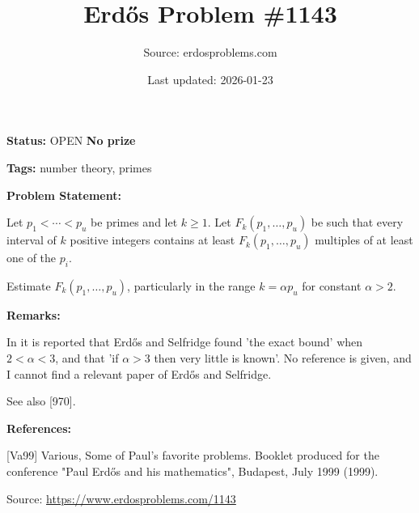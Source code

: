 \documentclass{article}
\title{Erd\H{o}s Problem \#1143}
\date{Last updated: 2026-01-23}
\author{Source: erdosproblems.com}
\begin{document}
\maketitle

\noindent\textbf{Status:} OPEN \quad \textbf{No prize}

\noindent\textbf{Tags:} number theory, primes

\medskip
\noindent\textbf{Problem Statement:}

Let $p_1<\cdots<p_u$ be primes and let $k\geq 1$. Let $F_k(p_1,\ldots,p_u)$ be such that every interval of $k$ positive integers contains at least $F_k(p_1,\ldots,p_u)$ multiples of at least one of the $p_i$.

Estimate $F_k(p_1,\ldots,p_u)$, particularly in the range $k=\alpha p_u$ for constant $\alpha>2$.

\bigskip
\noindent\textbf{Remarks:}

In \cite{Va99} it is reported that Erd\H{o}s and Selfridge found 'the exact bound' when $2<\alpha<3$, and that 'if $\alpha>3$ then very little is known'. No reference is given, and I cannot find a relevant paper of Erd\H{o}s and Selfridge.

See also [970].

\bigskip
\noindent\textbf{References:}

[Va99] Various, Some of Paul's favorite problems. Booklet produced for the conference "Paul Erd\H{o}s and his mathematics", Budapest, July 1999 (1999).

\bigskip
\noindent\small{Source: \url{https://www.erdosproblems.com/1143}}
\end{document}
